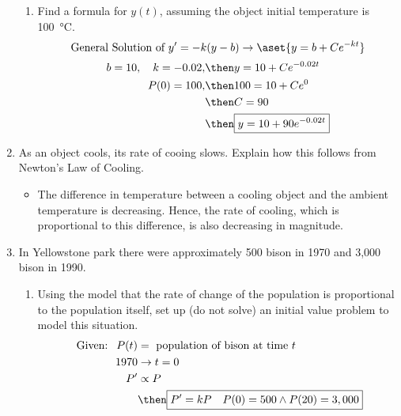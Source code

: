 \documentclass{nosvagor-notes}
\begin{document}
\begin{enumerate}
\begin{enumerate}
     \item Find a formula for \(y(t)\), assuming the object initial temperature
       is \SI{100}{\celsius}.
       \[%
        \text{General Solution of}~y' = -k(y - b) \to \aset{y = b + Ce^{-kt}}
       \]%
       \begin{align*}
         b = 10, \quad k = -0.02, &\then y = 10 + Ce^{-0.02 t} \\
         P(0) = 100, &\then 100 = 10 + Ce^{0} \\
                     &\then C = 90 \\
                     &\then \boxed{y = 10 + 90e^{-0.02t}}
       \end{align*}
       \vspace{60pt}
   \end{enumerate}

  \item As an object cools, its rate of cooing slows. Explain how this follows
    from Newton's Law of Cooling.

    \vspace{16pt}
    \begin{itemize}
      \item The difference in temperature between a cooling object and the ambient
        temperature is decreasing. Hence, the rate of cooling, which is
        proportional to this difference, is also decreasing in magnitude.

    \end{itemize}
    \newpage

  \item In Yellowstone park there were approximately 500 bison in 1970 and
    3,000 bison in 1990.
    \begin{enumerate}
      \item Using the model that the rate of change of the population is
        proportional to the population itself, set up (do not solve) an initial
        value problem to model this situation.
        \begin{align*}
          ~\text{Given: }~
          P(t) &= ~\text{population of bison at time}~ t \\
          1970 &\to t = 0 \\
          P' &\propto P \\
             &\then \boxed{P' = kP \quad
             P(0) = 500 \land P(20) = 3,000}
        \end{align*}
        \vspace{30pt}


\end{enumerate}
\end{enumerate}
\end{document}
